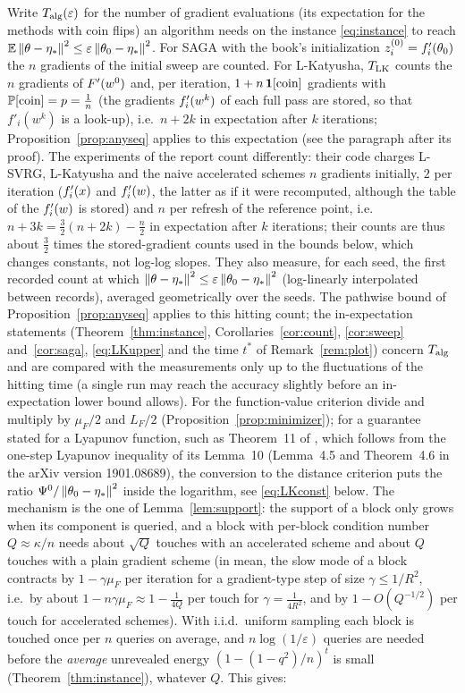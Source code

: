 Write $T_{\rm alg}(\varepsilon)$ for the number of gradient evaluations (its expectation for the methods with coin flips) an algorithm needs on the instance \eqref{eq:instance} to reach $\mathbb{E}\left\|\theta-\eta_\ast\right\|^2\le\varepsilon\left\|\theta_0-\eta_\ast\right\|^2$. For SAGA with the book's initialization $z_i^{(0)}=f'_i(\theta_0)$ the $n$ gradients of the initial sweep are counted. For L-Katyusha, $T_{\rm LK}$ counts the $n$ gradients of $F'(w^0)$ and, per iteration, $1+n\,\mathbf{1}[\text{coin}]$ gradients with $\mathbb{P}[\text{coin}]=p=\frac1n$ (the gradients $f'_i(w^k)$ of each full pass are stored, so that $f'_i(w^k)$ is a look-up), i.e.\ $n+2k$ in expectation after $k$ iterations; Proposition~\ref{prop:anyseq} applies to this expectation (see the paragraph after its proof). The experiments of the report count differently: their code charges L-SVRG, L-Katyusha and the naive accelerated schemes $n$ gradients initially, $2$ per iteration ($f'_i(x)$ and $f'_i(w)$, the latter as if it were recomputed, although the table of the $f'_i(w)$ is stored) and $n$ per refresh of the reference point, i.e.\ $n+3k=\frac32(n+2k)-\frac n2$ in expectation after $k$ iterations; their counts are thus about $\frac32$ times the stored-gradient counts used in the bounds below, which changes constants, not log-log slopes. They also measure, for each seed, the first recorded count at which $\left\|\theta-\eta_\ast\right\|^2\le\varepsilon\left\|\theta_0-\eta_\ast\right\|^2$ (log-linearly interpolated between records), averaged geometrically over the seeds. The pathwise bound of Proposition~\ref{prop:anyseq} applies to this hitting count; the in-expectation statements (Theorem~\ref{thm:instance}, Corollaries~\ref{cor:count}, \ref{cor:sweep} and~\ref{cor:saga}, \eqref{eq:LKupper} and the time $t^\ast$ of Remark~\ref{rem:plot}) concern $T_{\rm alg}$ and are compared with the measurements only up to the fluctuations of the hitting time (a single run may reach the accuracy slightly before an in-expectation lower bound allows). For the function-value criterion divide and multiply by $\mu_F/2$ and $L_F/2$ (Proposition~\ref{prop:minimizer}); for a guarantee stated for a Lyapunov function, such as Theorem~11 of \cite{kovalev2020dont}, which follows from the one-step Lyapunov inequality of its Lemma~10 (Lemma~4.5 and Theorem~4.6 in the arXiv version 1901.08689), the conversion to the distance criterion puts the ratio $\Psi^0/\left\|\theta_0-\eta_\ast\right\|^2$ inside the logarithm, see \eqref{eq:LKconst} below. The mechanism is the one of Lemma~\ref{lem:support}: the support of a block only grows when its component is queried, and a block with per-block condition number $Q\approx\kappa/n$ needs about $\sqrt Q$ touches with an accelerated scheme and about $Q$ touches with a plain gradient scheme (in mean, the slow mode of a block contracts by $1-\gamma\mu_F$ per iteration for a gradient-type step of size $\gamma\le1/R^2$, i.e.\ by about $1-n\gamma\mu_F\approx1-\frac1{4Q}$ per touch for $\gamma=\frac1{4R^2}$, and by $1-O(Q^{-1/2})$ per touch for accelerated schemes). With i.i.d.\ uniform sampling each block is touched once per $n$ queries on average, and $n\log(1/\varepsilon)$ queries are needed before the \emph{average} unrevealed energy $(1-(1-q^2)/n)^t$ is small (Theorem~\ref{thm:instance}), whatever $Q$. This gives:

